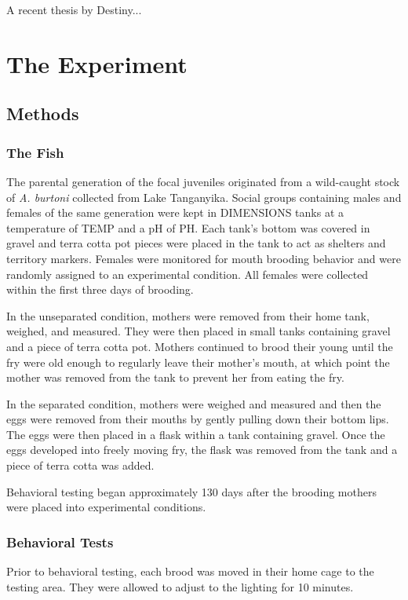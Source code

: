\documentclass[12pt,twoside]{reedthesis}
\begin{document}
A recent thesis by Destiny...

\chapter{The Experiment}

\section{Methods}
\subsection{The Fish}

The parental generation of the focal juveniles originated from a wild-caught stock of \textit{A. burtoni} collected from Lake Tanganyika. Social groups containing males and females of the same generation were kept in DIMENSIONS tanks at a temperature of TEMP and a pH of PH. Each tank's bottom was covered in gravel and terra cotta pot pieces were placed in the tank to act as shelters and territory markers. Females were monitored for mouth brooding behavior and were randomly assigned to an experimental condition. All females were collected within the first three days of brooding.

In the unseparated condition, mothers were removed from their home tank, weighed, and measured. They were then placed in small tanks containing gravel and a piece of terra cotta pot. Mothers continued to brood their young until the fry were old enough to regularly leave their mother's mouth, at which point the mother was removed from the tank to prevent her from eating the fry. 

In the separated condition, mothers were weighed and measured and then the eggs
were removed from their mouths by gently pulling down their bottom
lips. The eggs were then placed in a flask within a tank containing gravel. Once
the eggs developed into freely moving fry, the flask was removed from the tank and a piece of terra cotta was added.

Behavioral testing began approximately 130 days after the brooding mothers were placed into experimental conditions. 

\subsection{Behavioral Tests}
Prior to behavioral testing, each brood was moved in their home cage to the
testing area. They were allowed to adjust to the lighting for 10 minutes. 
\end{document}
